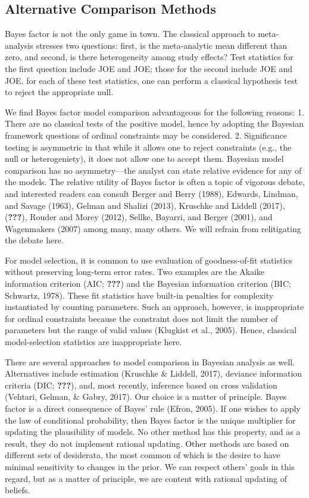 \documentclass[english,man]{apa6}
\theoremstyle{definition}
\theoremstyle{definition}
\theoremstyle{definition}
\theoremstyle{remark}
\begin{document}
\subsection{Alternative Comparison
Methods}\label{alternative-comparison-methods}

Bayes factor is not the only game in town. The classical approach to
meta-analysis stresses two questions: first, is the meta-analytic mean
different than zero, and second, is there heterogeneity among study
effects? Test statistics for the first question include JOE and JOE;
those for the second include JOE and JOE. for each of these test
statistics, one can perform a classical hypothesis test to reject the
appropriate null.

We find Bayes factor model comparison advantageous for the following
reasons: 1. There are no classical tests of the positive model, hence by
adopting the Bayesian framework questions of ordinal constraints may be
considered. 2. Significance testing is asymmetric in that while it
allows one to reject constraints (e.g., the null or heterogeniety), it
does not allow one to accept them. Bayesian model comparison has no
asymmetry---the analyst can state relative evidence for any of the
models. The relative utility of Bayes factor is often a topic of
vigorous debate, and interested readers can consult Berger and Berry
(1988), Edwards, Lindman, and Savage (1963), Gelman and Shalizi (2013),
Kruschke and Liddell (2017), ({\textbf{???}}), Rouder and Morey (2012),
Sellke, Bayarri, and Berger (2001), and Wagenmakers (2007) among many,
many others. We will refrain from relitigating the debate here.

For model selection, it is common to use evaluation of goodness-of-fit
statistics without preserving long-term error rates. Two examples are
the Akaike information criterion (AIC; {\textbf{???}}) and the Bayesian
information criterion (BIC; Schwartz, 1978). These fit statistics have
built-in penalties for complexity instantiated by counting parameters.
Such an approach, however, is inappropriate for ordinal constraints
because the constraint does not limit the number of parameters but the
range of valid values (Klugkist et al., 2005). Hence, classical
model-selection statistics are inappropriate here.

There are several approaches to model comparison in Bayesian analysis as
well. Alternatives include estimation (Kruschke \& Liddell, 2017),
deviance information criteria (DIC; {\textbf{???}}), and, most recently,
inference based on cross validation (Vehtari, Gelman, \& Gabry, 2017).
Our choice is a matter of principle. Bayes factor is a direct
consequence of Bayes' rule (Efron, 2005). If one wishes to apply the law
of conditional probability, then Bayes factor is the unique multiplier
for updating the plausibility of models. No other method has this
property, and as a result, they do not implement rational updating.
Other methods are based on different sets of desiderata, the most common
of which is the desire to have minimal sensitivity to changes in the
prior. We can respect others' goals in this regard, but as a matter of
principle, we are content with rational updating of beliefs.
\end{document}
